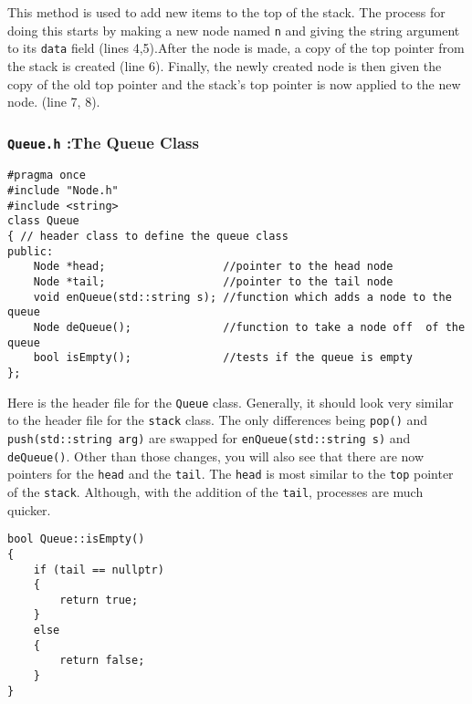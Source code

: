\documentclass[letterpaper, 10pt]{article}
\begin{document}
\vspace{2.5em}

This method is used to add new items to the top of the stack. The process for doing this starts by making a new node named \texttt{n} and giving the string argument to its \texttt{data} field (lines 4,5).After the node is made, a copy of the top pointer from the stack is created (line 6). Finally, the newly created node is then given the copy of the old top pointer and the stack's top pointer is now applied to the new node. (line 7, 8). 



\subsubsection{\texttt{Queue.h} :The Queue Class}
\begin{addmargin}[-5em]{1em}
\begin{small}
\begin{verbatim}
#pragma once
#include "Node.h"
#include <string>
class Queue
{ // header class to define the queue class
public:
	Node *head;					 //pointer to the head node
	Node *tail;					 //pointer to the tail node
	void enQueue(std::string s); //function which adds a node to the queue
	Node deQueue();				 //function to take a node off  of the queue
	bool isEmpty();				 //tests if the queue is empty
};
\end{verbatim}
\end{small}
\end{addmargin}

Here is the header file for the \texttt{Queue} class. Generally, it should look very similar to the header file for the \texttt{stack} class. The only differences being \texttt{pop()} and \texttt{push(std::string arg)} are swapped for \texttt{enQueue(std::string s)} and \texttt{deQueue()}. Other than those changes, you will also see that there are now pointers for the \texttt{head} and the \texttt{tail}. The \texttt{head} is most similar to the \texttt{top} pointer of the \texttt{stack}. Although, with the addition of the \texttt{tail}, processes are much quicker.


\begin{addmargin}[-5em]{1em}
\begin{small}
\begin{verbatim}
bool Queue::isEmpty()
{
	if (tail == nullptr)
	{
		return true;
	}
	else
	{
		return false;
	}
}
\end{verbatim}

\end{small}
\end{addmargin}
\end{document}
